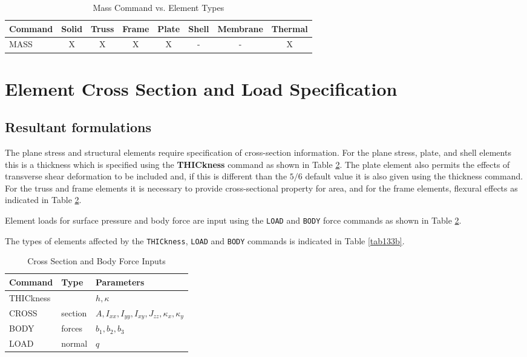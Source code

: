 \begin{table}[ht!]
\begin{center}
\begin{tabular}{| l | c | c | c | c | c | c | c |} \hline
Command & Solid & Truss & Frame & Plate & Shell & Membrane & Thermal \\ \hline
MASS          & X & X & X & X & - & - & X \\ \hline
\end{tabular}
\end{center}
\caption{Mass Command vs. Element Types}
\label{tab132b}
\end{table}

\section{Element Cross Section and Load Specification}
\label{xsect}

\subsection{Resultant formulations}

The plane stress and structural elements require specification of
cross-section information.
For the plane stress, plate, and shell
elements this is a thickness which is specified using the {\bf
THICkness} command as shown in Table \ref{tab133a}.
The plate element also permits the effects
of transverse shear deformation to be included and, if this is
different than the $5/6$ default value it is also given using the thickness
command.
For the truss and frame elements it is necessary to provide cross-sectional
property for area, and for the frame elements, flexural effects as indicated
in Table \ref{tab133a}.

Element loads for surface pressure and body force are input using the
{\tt LOAD} and {\tt BODY} force commands as shown in Table \ref{tab133a}.

The types of elements affected by the {\tt THICkness}, {\tt LOAD} and
{\tt BODY} commands is indicated in Table \ref{tab133b}.

\begin{table}[ht!]
\begin{center}
\begin{tabular}{| l | l | l |} \hline
Command & Type & Parameters \\ \hline
THICkness & {}      & $h, \kappa$ \\
CROSS     & section & $A, I_{xx}, I_{yy}, I_{xy},
J_{zz}, \kappa_x, \kappa_y$ \\ \hline
BODY & forces   & $b_1, b_2, b_3$ \\
LOAD & normal   & $q$ \\ \hline
\end{tabular}
\end{center}
\caption{Cross Section and Body Force Inputs}
\label{tab133a}
\end{table}

